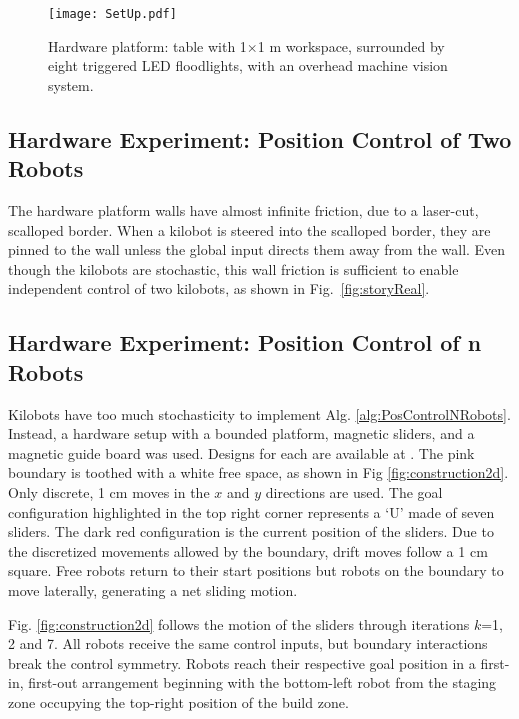 \begin{figure}
\begin{center}
	\texttt{[image: SetUp.pdf]}
\end{center}
\vspace{-1em}
\caption{\label{fig:setup}
Hardware platform:  table with 1$\times$1 m workspace, surrounded by eight  triggered LED floodlights, with an overhead machine vision system.
}
\vspace{-1em}
\end{figure}
\subsection{Hardware Experiment: Position Control of Two Robots}
The hardware platform walls have almost infinite friction, due to a laser-cut, scalloped border. When a kilobot is steered into the scalloped border, they are pinned to the wall unless the global input directs them away from the wall.  Even though the kilobots are stochastic, this wall friction is sufficient to enable independent control of two kilobots, as shown in Fig.~\ref{fig:storyReal}.

\subsection{Hardware Experiment: Position Control of n Robots}
Kilobots have too much stochasticity to implement Alg. \ref{alg:PosControlNRobots}. Instead, a hardware setup with a bounded platform, magnetic sliders, and a magnetic guide board was used.  Designs for each are available at \citep{arunhardware}. The pink boundary is toothed with a white free space, as shown in Fig \ref{fig:construction2d}. Only discrete, 1 cm moves in the $x$ and $y$ directions are used. The goal configuration highlighted in the top right corner represents a `U' made of seven sliders. The dark red configuration is the current position of the sliders. 
Due to the discretized movements allowed by the boundary, drift moves follow a 1 cm square.  Free robots return to their start positions but robots on the boundary to move laterally, generating a net sliding motion.

Fig. \ref{fig:construction2d} follows the motion of the sliders through iterations  $k$=1, 2 and 7. All robots receive the same control inputs, but boundary interactions break the control symmetry.  Robots reach their respective goal position in a first-in, first-out arrangement beginning with the bottom-left robot from the staging zone occupying the top-right position of the build zone.

